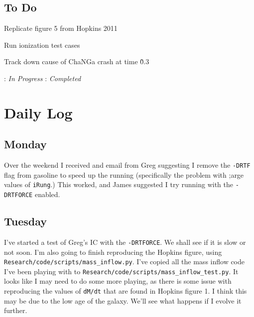 \documentclass[11pt,letterpaper]{article}
\begin{document}
\subsection*{To Do}
\begin{bullets}
\item[\textleaf] Replicate figure 5 from Hopkins 2011
\item[\checkmark] Run ionization test cases
\item Track down cause of ChaNGa crash at time \~0.3
\end{bullets}

\textleaf : \textit{In Progress} \qquad \checkmark : \textit{Completed}

\section*{Daily Log}
\subsection*{Monday}
Over the weekend I received and email from Greg suggesting I remove the 
\verb!-DRTF! flag from gasoline to speed up the running (specifically the
problem with ;arge values of \verb!iRung!.)  This worked, and James suggested I
try running with the \verb!-DRTFORCE! enabled.
\subsection*{Tuesday}
I've started a test of Greg's IC with the \verb!-DRTFORCE!.  We shall see if it
is slow or not soon.  I'm also going to finish reproducing the Hopkins figure, 
using \verb!Research/code/scripts/mass_inflow.py!.  I've copied all the mass
inflow code I've been playing with to 
\verb!Research/code/scripts/mass_inflow_test.py!.  It looks like I may need to
do some more playing, as there is some issue with reproducing the values of
\verb!dM/dt! that are found in Hopkins figure 1.  I think this may be due to
the low age of the galaxy.  We'll see what happens if I evolve it further.
\end{document}
